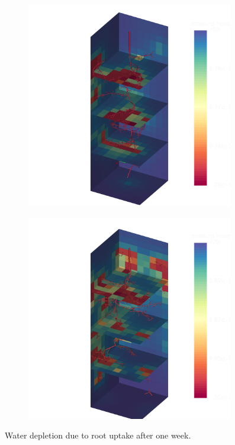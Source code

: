 \begin{figure}
\begin{subfigure}[c]{0.5\textwidth}
\includegraphics[width=0.99\textwidth]{example6c.png}
 \label{fig:example6c}
\end{subfigure}
\begin{subfigure}[c]{0.5\textwidth}
\includegraphics[width=0.99\textwidth]{example6c_periodic.png}
 \label{fig:example6c_peridodic}
\end{subfigure}
\caption{Water depletion due to root uptake after one week. } \label{fig:example6c}
\end{figure}


